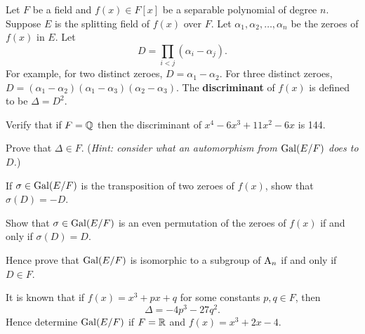 \begin{problem}
    Let $F$ be a field and $f(x) \in F[x]$ be a separable polynomial of degree $n$. Suppose $E$ is the splitting field of $f(x)$ over $F$. Let $\alpha_1, \alpha_2, \dots, \alpha_n$ be the zeroes of $f(x)$ in $E$. Let
    \[
        D = \prod_{i<j}(\alpha_i - \alpha_j).
    \]
    For example, for two distinct zeroes, $D = \alpha_1 - \alpha_2$. For three distinct zeroes, $D = (\alpha_1-\alpha_2)(\alpha_1-\alpha_3)(\alpha_2-\alpha_3)$. The \textbf{discriminant} of $f(x)$ is defined to be $\Delta = D^2$.
    \begin{partquestions}{\roman*}
        \item Verify that if $F = \mathbb{Q}$ then the discriminant of $x^4 - 6x^3 + 11x^2 - 6x$ is 144.
        \item Prove that $\Delta \in F$.\newline
        (\textit{Hint: consider what an automorphism from $\mathrm{Gal}(E/F)$ does to $D$.})
        \item If $\sigma \in \mathrm{Gal}(E/F)$ is the transposition of two zeroes of $f(x)$, show that $\sigma(D) = -D$.
        \item Show that $\sigma \in \mathrm{Gal}(E/F)$ is an even permutation of the zeroes of $f(x)$ if and only if $\sigma(D) = D$.
        \item Hence prove that $\mathrm{Gal}(E/F)$ is isomorphic to a subgroup of $\mathrm{A}_{n}$ if and only if $D \in F$.
        \item It is known that if $f(x) = x^3 + px + q$ for some constants $p, q \in F$, then
        \[
            \Delta = -4p^3 - 27q^2.
        \]
        Hence determine $\mathrm{Gal}(E/F)$ if $F = \mathbb{R}$ and $f(x) = x^3 + 2x - 4$.
    \end{partquestions}
\end{problem}
